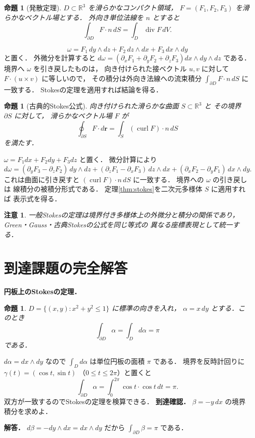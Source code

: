 \documentclass[a5paper,10pt,onecolumn]{jsarticle}
\makeatletter
\theoremstyle{mathnotetheorem}
\newtheorem{proposition}[theorem]{命題}
\newtheorem{remark}[theorem]{注意}
\renewcommand{\proofname}{証明}
\renewenvironment{proof}[1][\proofname]{%
  \par\pushQED{\qed}\normalfont\topsep4\p@\@plus2\p@\relax
  \trivlist\item[\hskip\labelsep\bfseries #1]\ignorespaces
}{\popQED\endtrivlist\@endpefalse}
\makeatother
\begin{document}
\begin{proposition}[発散定理]\label{prop:divergence}
$D\subset\mathbb R^3$ を滑らかなコンパクト領域，
$F=(F_1,F_2,F_3)$ を滑らかなベクトル場とする．
外向き単位法線を $n$ とすると
\[
 \int_{\partial D}F\cdot n\,dS
 =\int_D\operatorname{div}F\,dV.
\]
\end{proposition}
\begin{proof}
\[
 \omega=F_1\,dy\wedge dz+
 F_2\,dz\wedge dx+
 F_3\,dx\wedge dy
\]
と置く．
外微分を計算すると
$d\omega=(\partial_xF_1+\partial_yF_2+\partial_zF_3)
 dx\wedge dy\wedge dz$ である．
境界へ $\omega$ を引き戻したものは，
向き付けられた接ベクトル $u,v$ に対して
$F\cdot(u\times v)$ に等しいので，
その積分は外向き法線への流束積分
$\int_{\partial D}F\cdot n\,dS$ に一致する．
Stokesの定理を適用すれば結論を得る．
\end{proof}

\begin{proposition}[古典的Stokes公式]\label{prop:curl}
向き付けられた滑らかな曲面 $S\subset\mathbb R^3$ と
その境界 $\partial S$ に対して，
滑らかなベクトル場 $F$ が
\[
 \oint_{\partial S}F\cdot d\boldsymbol r
 =\int_S(\operatorname{curl}F)\cdot n\,dS
\]
を満たす．
\end{proposition}
\begin{proof}
$\omega=F_1dx+F_2dy+F_3dz$ と置く．
微分計算により
\[
 d\omega=(\partial_yF_3-\partial_zF_2)\,dy\wedge dz
 +(\partial_zF_1-\partial_xF_3)\,dz\wedge dx
 +(\partial_xF_2-\partial_yF_1)\,dx\wedge dy.
\]
これは曲面に引き戻すと
$(\operatorname{curl}F)\cdot n\,dS$ に一致する．
境界への $\omega$ の引き戻しは
線積分の被積分形式である．
定理\ref{thm:stokes}を二次元多様体 $S$ に適用すれば
表示式を得る．
\end{proof}

\begin{remark}
一般Stokesの定理は境界付き多様体上の外微分と積分の関係であり，
Green・Gauss・古典Stokesの公式を同じ等式の
異なる座標表現として統一する．
\end{remark}

\section{到達課題の完全解答}
\noindent\textbf{円板上のStokesの定理．}
\begin{proposition}
$D=\{(x,y):x^2+y^2\le1\}$ に標準の向きを入れ，
$\alpha=x\,dy$ とする．このとき
\[
\int_{\partial D}\alpha
=\int_Dd\alpha=\pi
\]
である．
\end{proposition}
\begin{proof}
$d\alpha=dx\wedge dy$ なので
$\int_Dd\alpha$ は単位円板の面積 $\pi$ である．
境界を反時計回りに
$\gamma(t)=(\cos t,\sin t)$
（$0\le t\le2\pi$）と置くと
\[
\int_{\partial D}\alpha
=\int_0^{2\pi}\cos t\cdot\cos t\,dt=\pi.
\]
双方が一致するのでStokesの定理を検算できる．
\end{proof}
\noindent\textbf{到達確認．}
$\beta=-y\,dx$ の境界積分を求めよ．
\par\noindent\textbf{解答．}
$d\beta=-dy\wedge dx=dx\wedge dy$ だから
$\int_{\partial D}\beta=\pi$ である．
\end{document}
